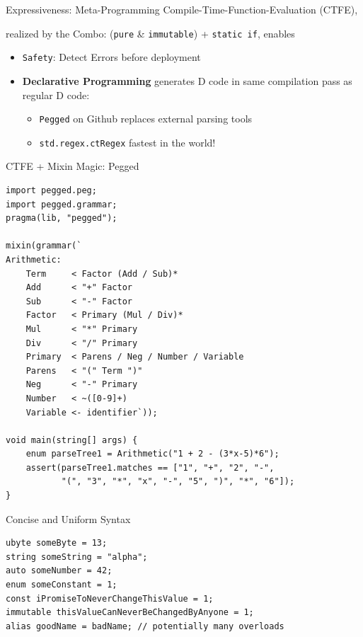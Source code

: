 \documentclass[xcolor=dvipsnames]{beamer}
\begin{document}
\begin{frame}[fragile]{Expressiveness: Meta-Programming}
  Compile-Time-Function-Evaluation (CTFE), \item realized by the Combo:
  (\texttt{pure} \& \texttt{immutable}) + \texttt{static if}, enables
  \begin{itemize}[<+->]
  \item \texttt{Safety}: Detect Errors before deployment
  \item \textbf{Declarative Programming} generates D code in same compilation
    pass as regular D code:
    \begin{itemize}[<+->]
    \item \texttt{Pegged} on Github replaces external parsing tools
    \item \texttt{std.regex.ctRegex} fastest in the world!
    \end{itemize}
  \end{itemize}
\end{frame}

\begin{frame}[fragile]{CTFE + Mixin Magic: Pegged}
\footnotesize
\begin{lstlisting}[frame=single]
import pegged.peg;
import pegged.grammar;
pragma(lib, "pegged");

mixin(grammar(`
Arithmetic:
    Term     < Factor (Add / Sub)*
    Add      < "+" Factor
    Sub      < "-" Factor
    Factor   < Primary (Mul / Div)*
    Mul      < "*" Primary
    Div      < "/" Primary
    Primary  < Parens / Neg / Number / Variable
    Parens   < "(" Term ")"
    Neg      < "-" Primary
    Number   < ~([0-9]+)
    Variable <- identifier`));

void main(string[] args) {
    enum parseTree1 = Arithmetic("1 + 2 - (3*x-5)*6");
    assert(parseTree1.matches == ["1", "+", "2", "-",
           "(", "3", "*", "x", "-", "5", ")", "*", "6"]);
}
\end{lstlisting}
\end{frame}

\begin{frame}[fragile]{Concise and Uniform Syntax}
\begin{lstlisting}[frame=single]
ubyte someByte = 13;
string someString = "alpha";
auto someNumber = 42;
enum someConstant = 1;
const iPromiseToNeverChangeThisValue = 1;
immutable thisValueCanNeverBeChangedByAnyone = 1;
alias goodName = badName; // potentially many overloads
\end{lstlisting}
\end{frame}
\end{document}
